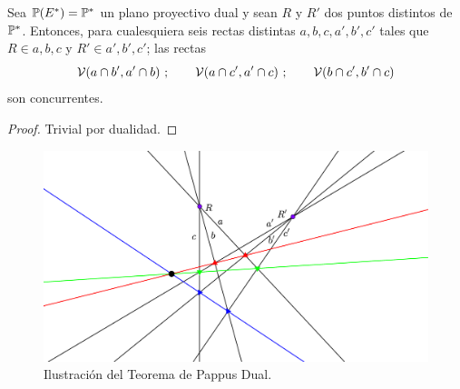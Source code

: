 \begin{theo}
	Sea $\mathbb{P}(E^*)=\mathbb{P}^*$ un plano proyectivo dual y sean $R$ y $R'$ dos puntos distintos de $\mathbb{P}^*$. Entonces, para cualesquiera seis rectas distintas $a,b,c,a',b',c'$ tales que $R\in a,b,c$ y $R'\in a',b',c'$; las rectas
	\begin{equation*}
		\mathcal{V}(a\cap b',a'\cap b) \ ; \qquad \mathcal{V}(a\cap c',a'\cap c) \ ; \qquad \mathcal{V}(b\cap c',b'\cap c)
	\end{equation*}
	son concurrentes.
\end{theo}
\begin{proof}
	Trivial por dualidad.
\end{proof}
\begin{figure}[h]
	\centering
	\includegraphics[scale=.2]{Graficos/Dual_Teorema_de_Papus.eps}
	\caption{Ilustración del Teorema de Pappus Dual.}
	\label{C3_pappusDual}
\end{figure}
